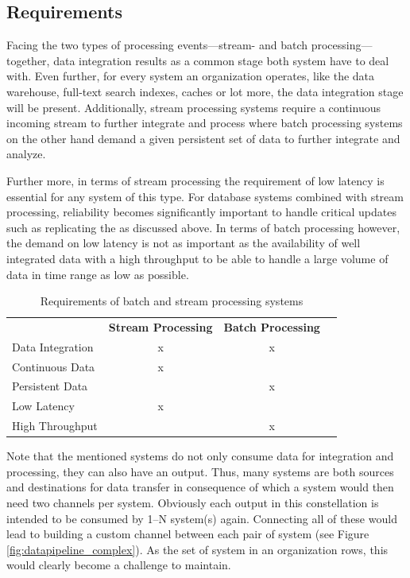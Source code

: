 \subsection{Requirements}
Facing the two types of processing events---stream- and batch
processing---together, data integration results as a common stage both system have to
deal with. Even further, for every system an organization operates, like the
data warehouse, full-text search indexes, caches or lot more, the data
integration stage will be present. 
Additionally, stream processing systems require a continuous
incoming stream to further integrate and process where batch processing systems
on the other hand demand a given persistent set of data to further integrate and analyze.

Further more, in terms of stream processing the requirement of low latency is
essential for any system of this type. For database systems combined with stream
processing, reliability becomes significantly important to handle critical updates 
such as replicating the as discussed above.
In terms of batch processing however, the demand on low latency is not as
important as the availability of well integrated data with a high throughput to
be able to handle a large volume of data in time range as low as possible.

\begin{table}[H]
\centering
\begin{tabular}{l|c|cl}
\multicolumn{1}{c|}{\textbf{}} & \textbf{Stream Processing} & \textbf{Batch
Processing} & \multicolumn{1}{c}{\textbf{}} \\ \cline{1-3}
Data Integration               & x                          & x
&                               \\
Continuous Data                & x                          &
&                               \\
Persistent Data                &                            & x
&                               \\
Low Latency                    & x                          &
&                               \\
High Throughput                     &                            & x
&
\end{tabular}
\caption{Requirements of batch and stream processing systems}
\label{table:requirements-batch-stream}
\end{table}

Note that the mentioned systems  do not only consume data for integration and
processing, they can also have an output. Thus, many systems are both sources and
destinations for data transfer in consequence of which a system would then need
two channels  per system. 
Obviously each output in this constellation is intended to be consumed by 1--N
system(s) again. Connecting all of these would lead to building a custom
channel between each pair of system (see Figure \ref{fig:datapipeline_complex}). As the set of system in an organization
rows, this would clearly become a challenge to maintain.

